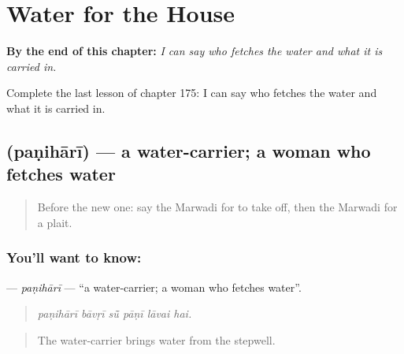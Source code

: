 
\chapter{Water for the House}
\label{ch:mw-water-for-the-house}

\begin{chapteropening}
\textbf{By the end of this chapter:} \emph{I can say who fetches the water and what it is carried in.}

Complete the last lesson of chapter 175: I can say who fetches the water and what it is carried in.
\end{chapteropening}

\section[\texorpdfstring{\mw{पणिहारी} (paṇihārī)}{पणिहारी (paṇihārī)}]{ (paṇihārī) — a water-carrier; a woman who fetches water}

\label{lesson:MW-C175-panihari}



\begin{quote}
Before the new one: say the Marwadi for to take off, then the Marwadi for a plait.
\end{quote}

\subsection*{You'll want to know: }
\textbf{} — \emph{paṇihārī} — \textquotedblleft{}a water-carrier; a woman who fetches water\textquotedblright{}.

\begin{quote}
     
\end{quote}

\begin{quote}
\emph{paṇihārī bāvṛī sū̃ pāṇī lāvai hai.}
\end{quote}

\begin{quote}
The water-carrier brings water from the stepwell.
\end{quote}

